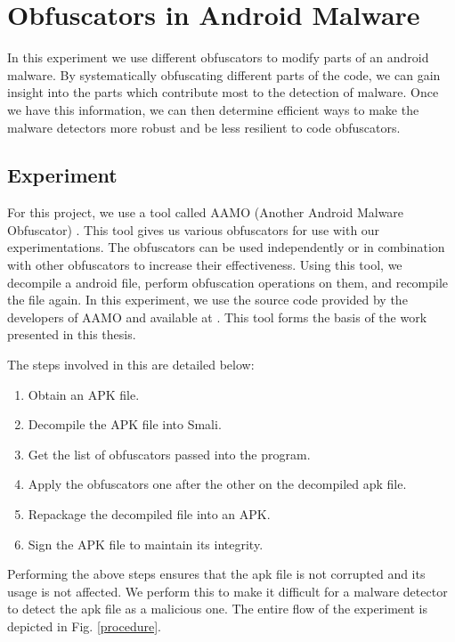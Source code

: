\chapter{Obfuscators in Android Malware}

In this experiment we use different obfuscators to modify parts of an android malware. By systematically obfuscating different parts of the code, we can gain insight into the parts which contribute most to the detection of malware. Once we have this information, we can then determine efficient ways to make the malware detectors more robust and be less resilient to code obfuscators.

\section{Experiment}
For this project, we use a tool called AAMO (Another Android Malware Obfuscator) \cite{aamo}. This tool gives us various obfuscators for use with our experimentations. The obfuscators can be used independently or in combination with other obfuscators to increase their effectiveness. Using this tool, we decompile a android file, perform obfuscation operations on them, and recompile the file again. In this experiment, we use the source code provided by the developers of AAMO \cite{aamo} and available at \cite{gitLoc}. This tool forms the basis of the work presented in this thesis.

The steps involved in this are detailed below:
 
 \begin{enumerate}
	 \item Obtain an APK file.
	 \item Decompile the APK file into Smali.
	 \item Get the list of obfuscators passed into the program.
	 \item Apply the obfuscators one after the other on the decompiled apk file.
	 \item Repackage the decompiled file into an APK.
	 \item Sign the APK file to maintain its integrity.
 \end{enumerate}
 
 Performing the above steps ensures that the apk file is not corrupted and its usage is not affected. We perform this to make it difficult for a malware detector to detect the apk file as a malicious one. The entire flow of the experiment is depicted in Fig. \ref{procedure}.
 
